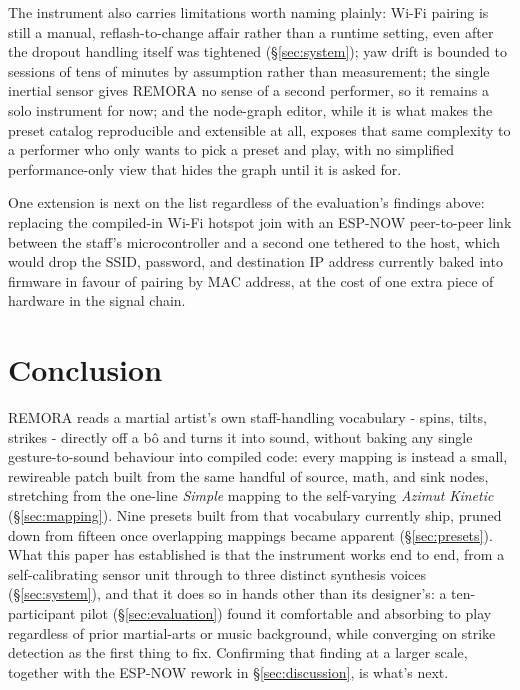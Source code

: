 \documentclass[a4paper,10pt,oneside]{article}
\newcommand{\preset}[1]{\textit{#1}}
\begin{document}
\begin{sloppy}
The instrument also carries limitations worth naming plainly: Wi-Fi pairing is still a
manual, reflash-to-change affair rather than a runtime setting, even after the dropout
handling itself was tightened (\S\ref{sec:system}); yaw drift is bounded to sessions of
tens of minutes by assumption rather than measurement; the single inertial sensor gives
REMORA no sense of a second performer, so it remains a solo instrument for now; and the
node-graph editor, while it is what makes the preset catalog reproducible and extensible
at all, exposes that same complexity to a performer who only wants to pick a preset and
play, with no simplified performance-only view that hides the graph until it is asked
for.

One extension is next on the list regardless of the evaluation's findings above:
replacing the compiled-in Wi-Fi hotspot join with an ESP-NOW peer-to-peer link between
the staff's microcontroller and a second one tethered to the host, which would drop the
SSID, password, and destination IP address currently baked into firmware in favour of
pairing by MAC address, at the cost of one extra piece of hardware in the signal chain.

\section{Conclusion}
\label{sec:conclusion}

REMORA reads a martial artist's own staff-handling vocabulary - spins, tilts, strikes -
directly off a b\^o and turns it into sound, without baking any single gesture-to-sound
behaviour into compiled code: every mapping is instead a small, rewireable patch built
from the same handful of source, math, and sink nodes, stretching from the one-line
\preset{Simple} mapping to the self-varying \preset{Azimut Kinetic} (\S\ref{sec:mapping}).
Nine presets built from that vocabulary currently ship, pruned down from fifteen once
overlapping mappings became apparent (\S\ref{sec:presets}). What this paper has
established is that the instrument works end to end, from a self-calibrating sensor
unit through to three distinct synthesis voices (\S\ref{sec:system}), and that it does
so in hands other than its designer's: a ten-participant pilot (\S\ref{sec:evaluation})
found it comfortable and absorbing to play regardless of prior martial-arts or music
background, while converging on strike detection as the first thing to fix. Confirming
that finding at a larger scale, together with the ESP-NOW rework in
\S\ref{sec:discussion}, is what's next.


\end{sloppy}
\end{document}
